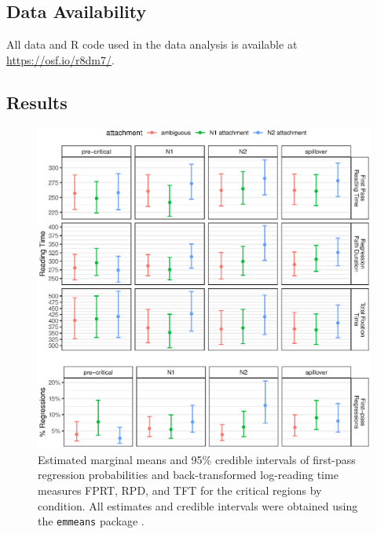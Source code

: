 \documentclass[english, doc]{apa7}\usepackage[]{graphicx}\usepackage[]{color}
\makeatletter
\def\maxwidth{ %
  \ifdim\Gin@nat@width>\linewidth
    \linewidth
  \else
    \Gin@nat@width
  \fi
}
\makeatother
\begin{document}
\subsection{Data Availability}
All data and R code used in the data analysis is available at \url{https://osf.io/r8dm7/}.

\subsection{Results}


\begin{figure}
\includegraphics[width=\maxwidth]{figure/eyeEMM.eps} 
\caption{Estimated marginal means and 95\% credible intervals of first-pass regression probabilities and back-transformed log-reading time measures FPRT, RPD, and TFT for the critical regions by condition. All estimates and credible intervals were obtained using the \protect\texttt{emmeans} package \protect\citep{emmeans}.
}
\label{fig:EyeRTsPlot}
\end{figure}
\end{document}
